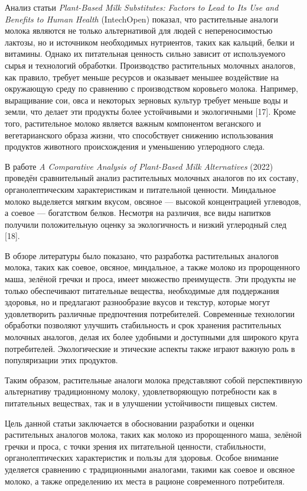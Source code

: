 \begin{multicols}{2}
Анализ статьи \emph{Plant-Based Milk Substitutes: Factors to Lead to Its
Use and Benefits to Human Health} (IntechOpen) показал, что растительные
аналоги молока являются не только альтернативой для людей с
непереносимостью лактозы, но и источником необходимых нутриентов, таких
как кальций, белки и витамины. Однако их питательная ценность сильно
зависит от используемого сырья и технологий обработки. Производство
растительных молочных аналогов, как правило, требует меньше ресурсов и
оказывает меньшее воздействие на окружающую среду по сравнению с
производством коровьего молока. Например, выращивание сои, овса и
некоторых зерновых культур требует меньше воды и земли, что делает эти
продукты более устойчивыми и экологичными {[}17{]}. Кроме того,
растительное молоко является важным компонентом веганского и
вегетарианского образа жизни, что способствует снижению использования
продуктов животного происхождения и уменьшению углеродного следа.

В работе \emph{A Comparative Analysis of Plant-Based Milk Alternatives}
(2022) проведён сравнительный анализ растительных молочных аналогов по
их составу, органолептическим характеристикам и питательной ценности.
Миндальное молоко выделяется мягким вкусом, овсяное --- высокой
концентрацией углеводов, а соевое --- богатством белков. Несмотря на
различия, все виды напитков получили положительную оценку за
экологичность и низкий углеродный след {[}18{]}.

В обзоре литературы было показано, что разработка растительных аналогов
молока, таких как соевое, овсяное, миндальное, а также молоко из
пророщенного маша, зелёной гречки и проса, имеет множество преимуществ.
Эти продукты не только обеспечивают питательные вещества, необходимые
для поддержания здоровья, но и предлагают разнообразие вкусов и текстур,
которые могут удовлетворить различные предпочтения потребителей.
Современные технологии обработки позволяют улучшить стабильность и срок
хранения растительных молочных аналогов, делая их более удобными и
доступными для широкого круга потребителей. Экологические и этические
аспекты также играют важную роль в популяризации этих продуктов.

Таким образом, растительные аналоги молока представляют собой
перспективную альтернативу традиционному молоку, удовлетворяющую
потребности как в питательных веществах, так и в улучшении устойчивости
пищевых систем.

Цель данной статьи заключается в обосновании разработки и оценки
растительных аналогов молока, таких как молоко из пророщенного маша,
зелёной гречки и проса, с точки зрения их питательной ценности,
стабильности, органолептических характеристик и пользы для здоровья.
Особое внимание уделяется сравнению с традиционными аналогами, такими
как соевое и овсяное молоко, а также определению их места в рационе
современного потребителя.


\end{multicols}
